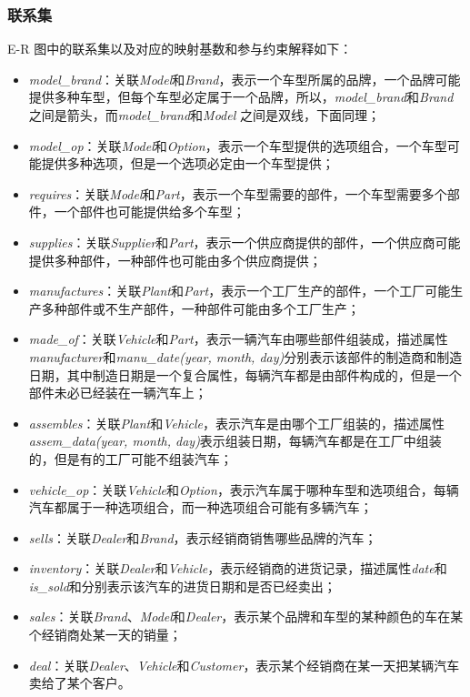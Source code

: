 \documentclass[hyperref,a4paper,UTF8]{ctexart}
\begin{document}
\subsubsection{联系集\label{sec:relationship-set}}

E-R 图中的联系集以及对应的映射基数和参与约束解释如下：

\begin{itemize}[itemsep=2pt,topsep=0pt,parsep=0pt]
    \item \textit{model\_brand}：关联\textit{Model}和\textit{Brand}，表示一个车型所属的品牌，一个品牌可能提供多种车型，但每个车型必定属于一个品牌，所以，\textit{model\_brand}和\textit{Brand} 之间是箭头，而\textit{model\_brand}和\textit{Model} 之间是双线，下面同理；
    \item \textit{model\_op}：关联\textit{Model}和\textit{Option}，表示一个车型提供的选项组合，一个车型可能提供多种选项，但是一个选项必定由一个车型提供；
    \item \textit{requires}：关联\textit{Model}和\textit{Part}，表示一个车型需要的部件，一个车型需要多个部件，一个部件也可能提供给多个车型；
    \item \textit{supplies}：关联\textit{Supplier}和\textit{Part}，表示一个供应商提供的部件，一个供应商可能提供多种部件，一种部件也可能由多个供应商提供；
    \item \textit{manufactures}：关联\textit{Plant}和\textit{Part}，表示一个工厂生产的部件，一个工厂可能生产多种部件或不生产部件，一种部件可能由多个工厂生产；
    \item \textit{made\_of}：关联\textit{Vehicle}和\textit{Part}，表示一辆汽车由哪些部件组装成，描述属性\textit{manufacturer}和\textit{manu\_date(year, month, day)}分别表示该部件的制造商和制造日期，其中制造日期是一个复合属性，每辆汽车都是由部件构成的，但是一个部件未必已经装在一辆汽车上；
    \item \textit{assembles}：关联\textit{Plant}和\textit{Vehicle}，表示汽车是由哪个工厂组装的，描述属性\textit{assem\_data(year, month, day)}表示组装日期，每辆汽车都是在工厂中组装的，但是有的工厂可能不组装汽车；
    \item \textit{vehicle\_op}：关联\textit{Vehicle}和\textit{Option}，表示汽车属于哪种车型和选项组合，每辆汽车都属于一种选项组合，而一种选项组合可能有多辆汽车；
    \item \textit{sells}：关联\textit{Dealer}和\textit{Brand}，表示经销商销售哪些品牌的汽车；
    \item \textit{inventory}：关联\textit{Dealer}和\textit{Vehicle}，表示经销商的进货记录，描述属性\textit{date}和\textit{is\_sold}和分别表示该汽车的进货日期和是否已经卖出；
    \item \textit{sales}：关联\textit{Brand}、\textit{Model}和\textit{Dealer}，表示某个品牌和车型的某种颜色的车在某个经销商处某一天的销量；
    \item \textit{deal}：关联\textit{Dealer}、\textit{Vehicle}和\textit{Customer}，表示某个经销商在某一天把某辆汽车卖给了某个客户。
\end{itemize}
\end{document}
